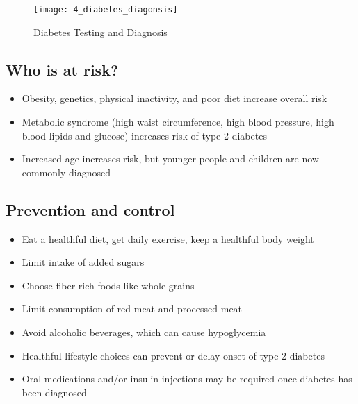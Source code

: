 \documentclass[title={Chapter 4}]{fdsn201notes}
\begin{document}
\begin{figure}[H]
	\centering
	\texttt{[image: 4\_diabetes\_diagonsis]}
	\caption{Diabetes Testing and Diagnosis}
	\label{fig:diabetes-testing-and-diagnosis}
\end{figure}

\subsection{Who is at risk?}\label{subsec:who-is-at-risk?}
\begin{itemize}
	\item Obesity, genetics, physical inactivity, and poor diet increase overall risk
	\item Metabolic syndrome (high waist circumference, high blood pressure, high blood lipids and glucose) increases risk of type 2 diabetes
	\item Increased age increases risk, but younger people and children are now commonly diagnosed
\end{itemize}

\subsection{Prevention and control}\label{subsec:prevention-and-control}
\begin{itemize}
	\item Eat a healthful diet, get daily exercise, keep a healthful body weight
	\item Limit intake of added sugars
	\item Choose fiber-rich foods like whole grains
	\item Limit consumption of red meat and processed meat
	\item Avoid alcoholic beverages, which can cause hypoglycemia
	\item Healthful lifestyle choices can prevent or delay onset of type 2 diabetes
	\item Oral medications and/or insulin injections may be required once diabetes has been diagnosed
\end{itemize}
\end{document}

